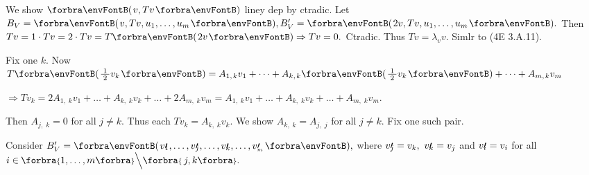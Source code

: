 We show $\Par{v,Tv}$ liney dep by ctradic. Let $B_V=\Par{v,Tv,u_1,\dots,u_m},B_V'=\Par{2v,Tv,u_1,\dots,u_m}.$\parSol{}
Then $Tv=1\cdot Tv=2\cdot Tv=T\Par{2v}\Rightarrow Tv=0.$ Ctradic. Thus $Tv=\lambda_v v.$ \;Simlr to (4E 3.A.11).\PfEnd\vspace{2pt}\quad
{}\par\quad
{\FontSmall Fix one $k.$ Now \,$T\Par{\frac{\;1\;}{2}v_k}=A_{1,\;\!k}v_1+\dots+A_{k,\;\!k}\Par{\frac{\;1\;}{2}v_k}+\dots+A_{m,\;\!k}v_m$}\par\quad
{\FontSmall$\Rightarrow Tv_k=2A_{1,\;\!k}v_1+\dots+A_{k,\;\!k}v_k+\dots+2A_{m,\;\!k}v_m=A_{1,\;\!k}v_1+\dots+A_{k,\;\!k}v_k+\dots+A_{m,\;\!k}v_m.$}\par\quad
{\FontSmall Then $A_{j,\;\!k}=0$ for all $j\neq k.$ Thus each $Tv_k=A_{k,\;\!k}v_k.$} \;We show $A_{k,\;\!k}=A_{j,\;\!j}$ for all $j\neq k.$ Fix one such pair.\vspace{1pt}\par\quad
Consider $B_V'=\Par{v\apostrophe{\hspace{-3pt}_1},\dots,v\apostrophe{\hspace{-3pt}_j},\dots,v\apostrophe{\hspace{-3pt}_k},\dots,v\apostrophe_{\hspace{-3pt}_m}},$ where $v\prime{\hspace{-3pt}_j}=v_k,\,\,v\prime{\hspace{-3pt}_k}=v_j$ and $v\prime{\hspace{-3pt}_i}=v_i$ for all $i\in\;\!\!\Bra{1,\dots,m}\Backslash[\Big]\Bra{\,j,k}.$\vspace{1pt}\par\quad

